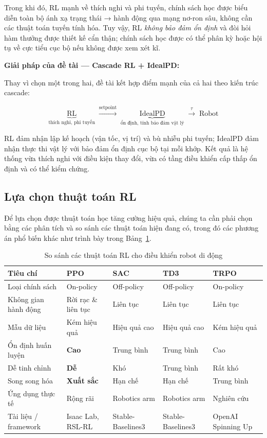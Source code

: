 Trong khi đó, RL mạnh về thích nghi và phi tuyến, chính sách học được
biểu diễn toàn bộ ánh xạ trạng thái → hành động qua mạng nơ-ron sâu,
không cần các thuật toán tuyến tính hóa. Tuy vậy, RL \textit{không bảo đảm ổn định} và
đòi hỏi hàm thưởng được thiết kế cẩn thận; chính sách học được có thể phân kỳ
hoặc hội tụ về cực tiểu cục bộ nếu không được xem xét kĩ.


\textbf{Giải pháp của đề tài — Cascade RL + IdealPD:}

Thay vì chọn một trong hai, đề tài kết hợp điểm mạnh của cả hai theo kiến
trúc cascade:

\begin{equation}
\underbrace{\text{RL}}_{\text{thích nghi, phi tuyến}}
\;\xrightarrow{\text{setpoint}}\;
\underbrace{\text{IdealPD}}_{\text{ổn định, tính bảo đảm vật lý}}
\;\xrightarrow{\tau}\;
\text{Robot}
\label{eq:cascade_principle}
\end{equation}

RL đảm nhận lập kế hoạch (vận tốc, vị trí) và bù nhiễu phi tuyến;
IdealPD đảm nhận thực thi vật lý với bảo đảm ổn định cục bộ tại
mỗi khớp. Kết quả là hệ thống vừa thích nghi với điều kiện thay đổi,
vừa có tầng điều khiển cấp thấp ổn định và có thể kiểm chứng.


\subsection{Lựa chọn thuật toán RL}
\label{sec:rl_choice}
Để lựa chọn được thuật toán học tăng cường hiệu quả, chúng ta cần phải chọn bằng các phân tích và so sánh các thuật toán hiện đang có, trong đó các phương án phổ biến khác như trình bày trong
Bảng~\ref{tab:rl_comparison}.


\begin{table}[H]
\centering
\caption{So sánh các thuật toán RL cho điều khiển robot di động}
\label{tab:rl_comparison}
\begin{tabularx}{\textwidth}{|l|X|X|X|X|}
\hline
\textbf{Tiêu chí} & \textbf{PPO} & \textbf{SAC} & \textbf{TD3} & \textbf{TRPO} \\
\hline
Loại chính sách & On-policy & Off-policy & Off-policy & On-policy \\
\hline
Không gian hành động & Rời rạc \& liên tục & Liên tục & Liên tục & Liên tục \\
\hline
Mẫu dữ liệu & Kém hiệu quả & Hiệu quả cao & Hiệu quả cao & Kém hiệu quả \\
\hline
Ổn định huấn luyện & \textbf{Cao} & Trung bình & Trung bình & Cao \\
\hline
Dễ tinh chỉnh & \textbf{Dễ} & Khó & Trung bình & Rất khó \\
\hline
Song song hóa & \textbf{Xuất sắc} & Hạn chế & Hạn chế & Trung bình \\
\hline
Ứng dụng thực tế & Rộng rãi & Robotics arm & Robotics arm & Nghiên cứu \\
\hline
Tài liệu / framework & Isaac Lab, RSL-RL & Stable-Baselines3 & Stable-Baselines3 & OpenAI Spinning Up \\
\hline
\end{tabularx}
\end{table}

